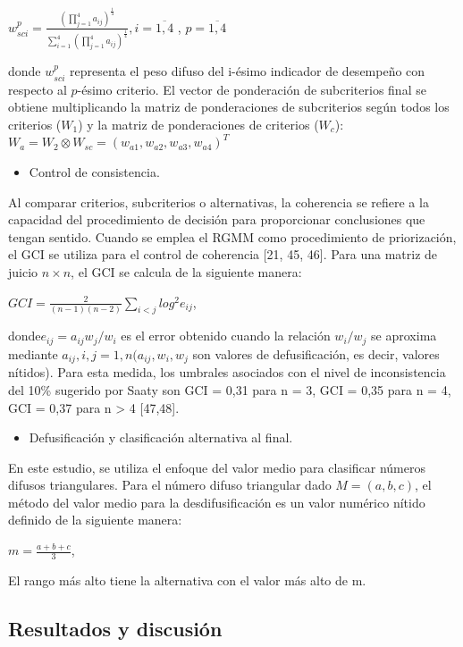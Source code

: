 \documentclass[
]{article}
\providecommand{\tightlist}{%
  \setlength{\itemsep}{0pt}\setlength{\parskip}{0pt}}
\begin{document}
\(w_{sci}^{p}=\frac{(\prod_{j=1}^{4}a_{ij})^{\frac{1}{4}}}{\sum_{i=1}^{4}(\prod_{j=1}^{4}a_{ij})^{\frac{1}{4}}}, i=\overline{1,4}\)
, \(p=\overline{1,4}\)

donde \(w_{sci}^{p}\) representa el peso difuso del i-ésimo indicador de
desempeño con respecto al \(p\)-ésimo criterio. El vector de ponderación
de subcriterios final se obtiene multiplicando la matriz de
ponderaciones de subcriterios según todos los criterios (\(W_1\)) y la
matriz de ponderaciones de criterios (\(W_c\)):
\(W_a=W_2\otimes W_{sc}=(w_{a1},w_{a2},w_{a3},w_{a4})^{T}\)

\begin{itemize}
\tightlist
\item
  Control de consistencia.
\end{itemize}

Al comparar criterios, subcriterios o alternativas, la coherencia se
refiere a la capacidad del procedimiento de decisión para proporcionar
conclusiones que tengan sentido. Cuando se emplea el RGMM como
procedimiento de priorización, el GCI se utiliza para el control de
coherencia {[}21, 45, 46{]}. Para una matriz de juicio \(n \times n\),
el GCI se calcula de la siguiente manera:

\(GCI=\frac{2}{(n-1)(n-2)}\sum_{i\lt j}^{}log^{2}e_{ij}\),

donde\(e_{ij}=a_{ij}w_j/w_i\) es el error obtenido cuando la relación
\(w_i/w_j\) se aproxima mediante
\(a_{ij} , i, j = 1, n (a_{ij} , w_i , w_j\) son valores de
defusificación, es decir, valores nítidos). Para esta medida, los
umbrales asociados con el nivel de inconsistencia del 10\% sugerido por
Saaty son GCI = 0,31 para n = 3, GCI = 0,35 para n = 4, GCI = 0,37 para
n \textgreater{} 4 {[}47,48{]}.

\begin{itemize}
\tightlist
\item
  Defusificación y clasificación alternativa al final.
\end{itemize}

En este estudio, se utiliza el enfoque del valor medio para clasificar
números difusos triangulares. Para el número difuso triangular dado
\(M = (a,b,c)\), el método del valor medio para la desdifusificación es
un valor numérico nítido definido de la siguiente manera:

\(m=\frac{a+b+c}{3}\),

El rango más alto tiene la alternativa con el valor más alto de m.

\hypertarget{resultados-y-discusiuxf3n}{%
\subsection{Resultados y discusión}\label{resultados-y-discusiuxf3n}}
\end{document}
